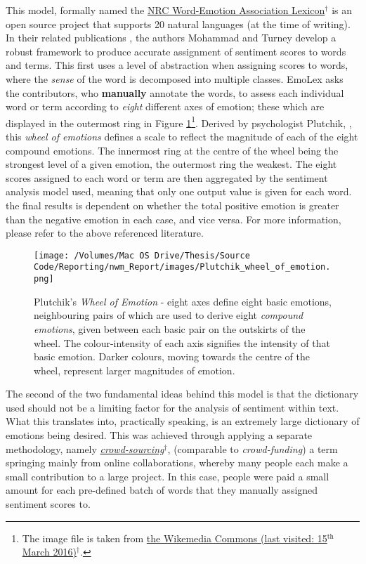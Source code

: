 \documentclass{article}
\begin{document}
This model, formally named the \href{http://saifmohammad.com/WebPages/NRC-Emotion-Lexicon.htm}{NRC Word-Emotion Association Lexicon$^{\dag{}}$} is an open source project that supports 20 natural languages (at the time of writing). In their related publications \cite{Mohammad13}, the authors Mohammad and Turney develop a robust framework to produce accurate assignment of sentiment scores to words and terms. This first uses a level of abstraction when assigning scores to words, where the \emph{sense} of the word is decomposed into multiple classes. EmoLex asks the contributors, who \textbf{manually} annotate the words, to assess each individual word or term according to \emph{eight} different axes of emotion; these which are displayed in the outermost ring in Figure \ref{fig:wheel-of-emotion}\footnote{The image file is taken from \href{https://en.wikipedia.org/wiki/Contrasting_and_categorization_of_emotions#Plutchik.27s_wheel_of_emotions}{ the Wikemedia Commons (last visited: 15$^{\text{th}}$ March 2016)$^{\dag{}}$}.}. Derived by psychologist Plutchik, \cite{plutchik1980general}, this \emph{wheel of emotions} defines a scale to reflect the magnitude of each of the eight compound emotions. The innermost ring at the centre of the wheel being the strongest level of a given emotion, the outermost ring the weakest.
The eight scores assigned to each word or term are then aggregated by the sentiment analysis model used, meaning that only one output value is given for each word. the final results is dependent on whether the total positive emotion is greater than the negative emotion in each case, and vice versa. For more information, please refer to the above referenced literature.

\begin{figure}[htb]
\centering
\texttt{[image: /Volumes/Mac OS Drive/Thesis/Source Code/Reporting/nwm\_Report/images/Plutchik\_wheel\_of\_emotion.png]}
\caption{\label{fig:wheel-of-emotion}Plutchik's \emph{Wheel of Emotion} - eight axes define eight basic emotions, neighbouring pairs of which are used to derive eight \emph{compound emotions}, given between each basic pair on the outskirts of the wheel. The colour-intensity of each axis signifies the intensity of that basic emotion. Darker colours, moving towards the centre of the wheel, represent larger magnitudes of emotion.}
\end{figure}

The second of the two fundamental ideas behind this model is that the dictionary used should not be a limiting factor for the analysis of sentiment within text. What this translates into, practically speaking, is an extremely large dictionary of emotions being desired. This was achieved through applying a separate methodology, namely \href{https://en.wikipedia.org/wiki/Crowdsourcing}{\emph{crowd-sourcing$^{\dag{}}$}}, (comparable to \emph{crowd-funding}) a term springing mainly from online collaborations, whereby many people each make a small contribution to a large project. In this case, people were paid a small amount for each pre-defined batch of words that they manually assigned sentiment scores to.
\end{document}
